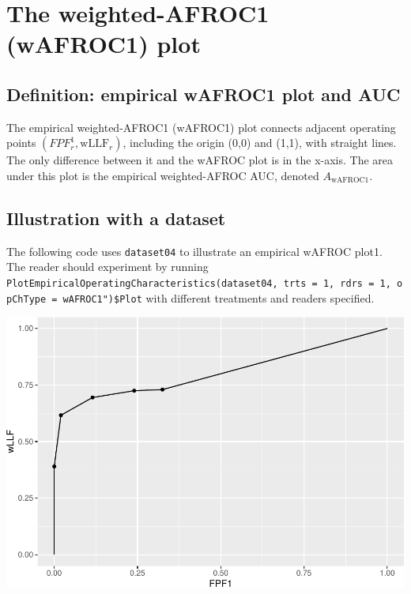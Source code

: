 \documentclass[
]{book}
\newenvironment{Shaded}{\begin{snugshade}}{\end{snugshade}}
\newcommand{\DataTypeTok}[1]{\textcolor[rgb]{0.13,0.29,0.53}{#1}}
\newcommand{\DecValTok}[1]{\textcolor[rgb]{0.00,0.00,0.81}{#1}}
\newcommand{\KeywordTok}[1]{\textcolor[rgb]{0.13,0.29,0.53}{\textbf{#1}}}
\newcommand{\NormalTok}[1]{#1}
\newcommand{\OperatorTok}[1]{\textcolor[rgb]{0.81,0.36,0.00}{\textbf{#1}}}
\newcommand{\StringTok}[1]{\textcolor[rgb]{0.31,0.60,0.02}{#1}}
\begin{document}
\hypertarget{empirical-wAFROC1}{%
\section{The weighted-AFROC1 (wAFROC1) plot}\label{empirical-wAFROC1}}

\hypertarget{empirical-definition-empirical-auc-wafroc1}{%
\subsection{Definition: empirical wAFROC1 plot and AUC}\label{empirical-definition-empirical-auc-wafroc1}}

The empirical weighted-AFROC1 (wAFROC1) plot connects adjacent operating points \(\left ( FPF_r^1, \text{wLLF}_r \right )\), including the origin (0,0) and (1,1), with straight lines. The only difference between it and the wAFROC plot is in the x-axis. The area under this plot is the empirical weighted-AFROC AUC, denoted \(A_{\text{wAFROC1}}\).

\hypertarget{empirical-wafroc1-plot-illustration}{%
\subsection{Illustration with a dataset}\label{empirical-wafroc1-plot-illustration}}

The following code uses \texttt{dataset04} to illustrate an empirical wAFROC plot1. The reader should experiment by running \texttt{PlotEmpiricalOperatingCharacteristics(dataset04,\ trts\ =\ 1,\ rdrs\ =\ 1,\ opChType\ =\ wAFROC1")\$Plot} with different treatments and readers specified.

\begin{Shaded}
\end{Shaded}

\includegraphics{03-empirical_files/figure-latex/unnamed-chunk-16-1.pdf}
\end{document}
